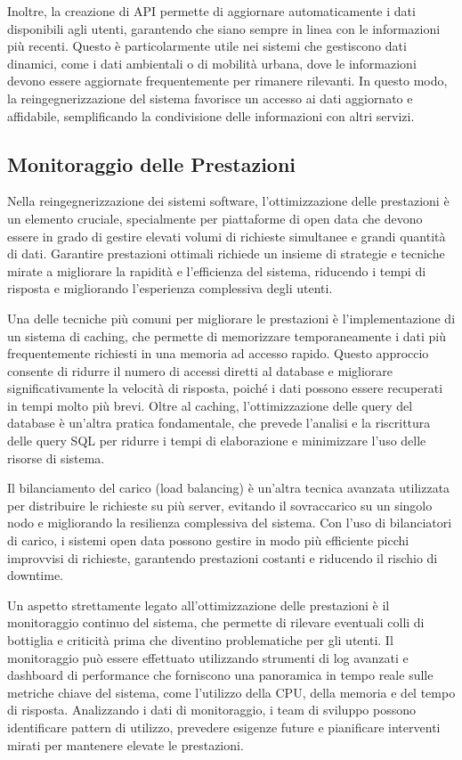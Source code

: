Inoltre, la creazione di API permette di aggiornare automaticamente i dati disponibili agli utenti, garantendo che siano sempre in linea con le informazioni più recenti. Questo è particolarmente utile nei sistemi che gestiscono dati dinamici, come i dati ambientali o di mobilità urbana, dove le informazioni devono essere aggiornate frequentemente per rimanere rilevanti. In questo modo, la reingegnerizzazione del sistema favorisce un accesso ai dati aggiornato e affidabile, semplificando la condivisione delle informazioni con altri servizi.

\subsection{Monitoraggio delle Prestazioni}

Nella reingegnerizzazione dei sistemi software, l’ottimizzazione delle prestazioni è un elemento cruciale, specialmente per piattaforme di open data che devono essere in grado di gestire elevati volumi di richieste simultanee e grandi quantità di dati. Garantire prestazioni ottimali richiede un insieme di strategie e tecniche mirate a migliorare la rapidità e l’efficienza del sistema, riducendo i tempi di risposta e migliorando l’esperienza complessiva degli utenti.

Una delle tecniche più comuni per migliorare le prestazioni è l'implementazione di un sistema di caching, che permette di memorizzare temporaneamente i dati più frequentemente richiesti in una memoria ad accesso rapido. Questo approccio consente di ridurre il numero di accessi diretti al database e migliorare significativamente la velocità di risposta, poiché i dati possono essere recuperati in tempi molto più brevi. Oltre al caching, l'ottimizzazione delle query del database è un'altra pratica fondamentale, che prevede l’analisi e la riscrittura delle query SQL per ridurre i tempi di elaborazione e minimizzare l’uso delle risorse di sistema.

Il bilanciamento del carico (load balancing) è un'altra tecnica avanzata utilizzata per distribuire le richieste su più server, evitando il sovraccarico su un singolo nodo e migliorando la resilienza complessiva del sistema. Con l’uso di bilanciatori di carico, i sistemi open data possono gestire in modo più efficiente picchi improvvisi di richieste, garantendo prestazioni costanti e riducendo il rischio di downtime.

Un aspetto strettamente legato all’ottimizzazione delle prestazioni è il monitoraggio continuo del sistema, che permette di rilevare eventuali colli di bottiglia e criticità prima che diventino problematiche per gli utenti. Il monitoraggio può essere effettuato utilizzando strumenti di log avanzati e dashboard di performance che forniscono una panoramica in tempo reale sulle metriche chiave del sistema, come l’utilizzo della CPU, della memoria e del tempo di risposta. Analizzando i dati di monitoraggio, i team di sviluppo possono identificare pattern di utilizzo, prevedere esigenze future e pianificare interventi mirati per mantenere elevate le prestazioni.

